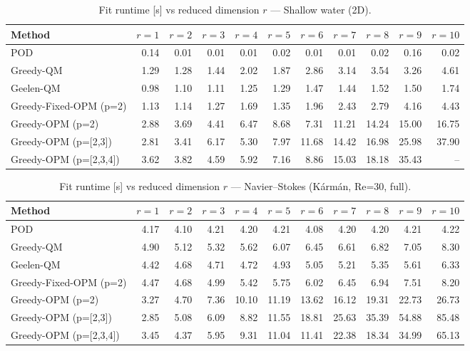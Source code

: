\begin{table}[t]
\centering
\caption{Fit runtime [s] vs reduced dimension $r$ --- Shallow water (2D).}
\label{tab:runtime-full-swe}
\small
\begin{tabular}{lrrrrrrrrrr}
\toprule
\textbf{Method} & $r=1$ & $r=2$ & $r=3$ & $r=4$ & $r=5$ & $r=6$ & $r=7$ & $r=8$ & $r=9$ & $r=10$ \\
\midrule
POD & 0.14 & 0.01 & 0.01 & 0.01 & 0.02 & 0.01 & 0.01 & 0.02 & 0.16 & 0.02 \\
Greedy-QM & 1.29 & 1.28 & 1.44 & 2.02 & 1.87 & 2.86 & 3.14 & 3.54 & 3.26 & 4.61 \\
Geelen-QM & 0.98 & 1.10 & 1.11 & 1.25 & 1.29 & 1.47 & 1.44 & 1.52 & 1.50 & 1.74 \\
Greedy-Fixed-OPM (p=2) & 1.13 & 1.14 & 1.27 & 1.69 & 1.35 & 1.96 & 2.43 & 2.79 & 4.16 & 4.43 \\
Greedy-OPM (p=2) & 2.88 & 3.69 & 4.41 & 6.47 & 8.68 & 7.31 & 11.21 & 14.24 & 15.00 & 16.75 \\
Greedy-OPM (p=[2,3]) & 2.81 & 3.41 & 6.17 & 5.30 & 7.97 & 11.68 & 14.42 & 16.98 & 25.98 & 37.90 \\
Greedy-OPM (p=[2,3,4]) & 3.62 & 3.82 & 4.59 & 5.92 & 7.16 & 8.86 & 15.03 & 18.18 & 35.43 & -- \\
\bottomrule
\end{tabular}
\end{table}

\begin{table}[t]
\centering
\caption{Fit runtime [s] vs reduced dimension $r$ --- Navier--Stokes (K\'arm\'an, Re=30, full).}
\label{tab:runtime-full-nse}
\small
\begin{tabular}{lrrrrrrrrrr}
\toprule
\textbf{Method} & $r=1$ & $r=2$ & $r=3$ & $r=4$ & $r=5$ & $r=6$ & $r=7$ & $r=8$ & $r=9$ & $r=10$ \\
\midrule
POD & 4.17 & 4.10 & 4.21 & 4.20 & 4.21 & 4.08 & 4.20 & 4.20 & 4.21 & 4.22 \\
Greedy-QM & 4.90 & 5.12 & 5.32 & 5.62 & 6.07 & 6.45 & 6.61 & 6.82 & 7.05 & 8.30 \\
Geelen-QM & 4.42 & 4.68 & 4.71 & 4.72 & 4.93 & 5.05 & 5.21 & 5.35 & 5.61 & 6.33 \\
Greedy-Fixed-OPM (p=2) & 4.47 & 4.68 & 4.99 & 5.42 & 5.75 & 6.02 & 6.45 & 6.94 & 7.51 & 8.20 \\
Greedy-OPM (p=2) & 3.27 & 4.70 & 7.36 & 10.10 & 11.19 & 13.62 & 16.12 & 19.31 & 22.73 & 26.73 \\
Greedy-OPM (p=[2,3]) & 2.85 & 5.08 & 6.09 & 8.82 & 11.55 & 18.81 & 25.63 & 35.39 & 54.88 & 85.48 \\
Greedy-OPM (p=[2,3,4]) & 3.45 & 4.37 & 5.95 & 9.31 & 11.04 & 11.41 & 22.38 & 18.34 & 34.99 & 65.13 \\
\bottomrule
\end{tabular}
\end{table}
